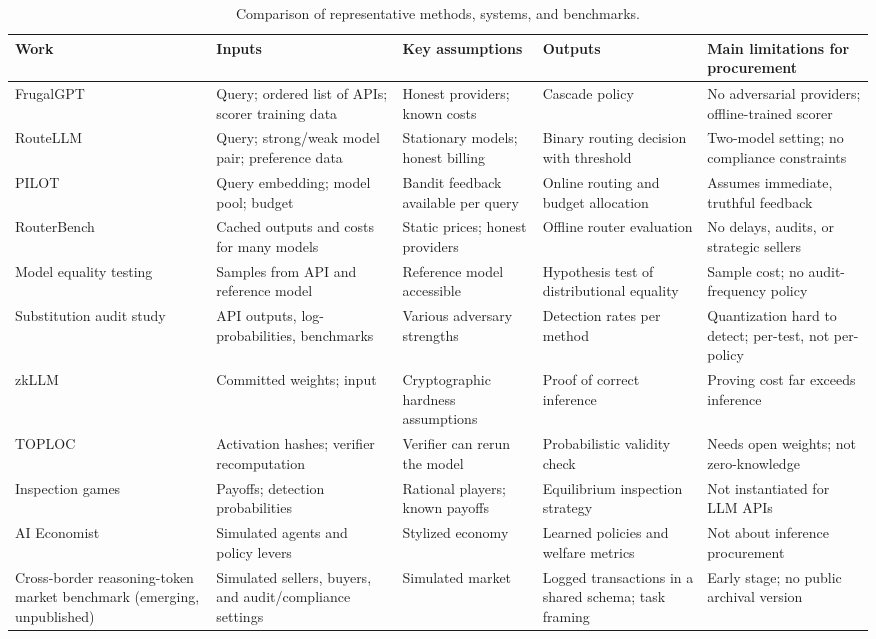 \begin{table}[t]
  \caption{Comparison of representative methods, systems, and benchmarks.}
  \label{tab:comparison}
  \centering
  \footnotesize
  \begin{tabular}{p{}p{}p{}p{}p{}}
    \toprule
    Work & Inputs & Key assumptions & Outputs & Main limitations for procurement \\
    \midrule
    FrugalGPT~\cite{chen2023frugalgpt} & Query; ordered list of APIs; scorer training data & Honest providers; known costs & Cascade policy & No adversarial providers; offline-trained scorer \\
    RouteLLM~\cite{ong2025routellm} & Query; strong/weak model pair; preference data & Stationary models; honest billing & Binary routing decision with threshold & Two-model setting; no compliance constraints \\
    PILOT~\cite{panda2025pilot} & Query embedding; model pool; budget & Bandit feedback available per query & Online routing and budget allocation & Assumes immediate, truthful feedback \\
    RouterBench~\cite{hu2024routerbench} & Cached outputs and costs for many models & Static prices; honest providers & Offline router evaluation & No delays, audits, or strategic sellers \\
    Model equality testing~\cite{gao2025equality} & Samples from API and reference model & Reference model accessible & Hypothesis test of distributional equality & Sample cost; no audit-frequency policy \\
    Substitution audit study~\cite{cai2025substitution} & API outputs, log-probabilities, benchmarks & Various adversary strengths & Detection rates per method & Quantization hard to detect; per-test, not per-policy \\
    zkLLM~\cite{sun2024zkllm} & Committed weights; input & Cryptographic hardness assumptions & Proof of correct inference & Proving cost far exceeds inference \\
    TOPLOC~\cite{ong2025toploc} & Activation hashes; verifier recomputation & Verifier can rerun the model & Probabilistic validity check & Needs open weights; not zero-knowledge \\
    Inspection games~\cite{avenhaus2002inspection} & Payoffs; detection probabilities & Rational players; known payoffs & Equilibrium inspection strategy & Not instantiated for LLM APIs \\
    AI Economist~\cite{zheng2022aieconomist} & Simulated agents and policy levers & Stylized economy & Learned policies and welfare metrics & Not about inference procurement \\
    Cross-border reasoning-token market benchmark (emerging, unpublished) & Simulated sellers, buyers, and audit/compliance settings & Simulated market & Logged transactions in a shared schema; task framing & Early stage; no public archival version \\
    \bottomrule
  \end{tabular}
\end{table}


